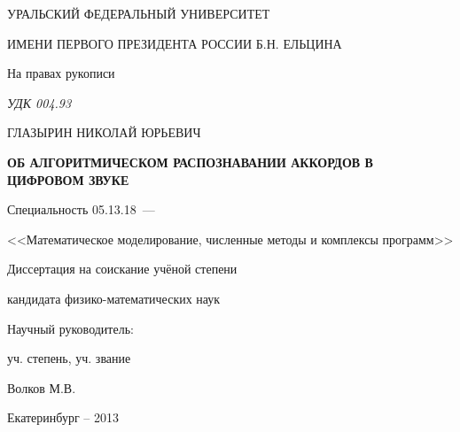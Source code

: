 \thispagestyle{empty}

\begin{center}
УРАЛЬСКИЙ ФЕДЕРАЛЬНЫЙ УНИВЕРСИТЕТ\par
ИМЕНИ ПЕРВОГО ПРЕЗИДЕНТА РОССИИ Б.Н. ЕЛЬЦИНА\par 
\par
\end{center}

\vspace{20mm}
\begin{flushright}
На правах рукописи

{\sl УДК 004.93}
\end{flushright}

\vspace{30mm}
\begin{center}
{\large ГЛАЗЫРИН НИКОЛАЙ ЮРЬЕВИЧ}
\end{center}

\vspace{5mm}
\begin{center}
{\bf \large ОБ АЛГОРИТМИЧЕСКОМ РАСПОЗНАВАНИИ АККОРДОВ В ЦИФРОВОМ ЗВУКЕ
\par}

\vspace{10mm}
{%
Специальность 05.13.18~---

<<Математическое моделирование, численные методы и комплексы программ>>
}

\vspace{10mm}
Диссертация на соискание учёной степени

кандидата физико-математических наук
\end{center}

\vspace{20mm}
\begin{flushright}
Научный руководитель:

уч. степень, уч. звание

Волков М.В.

\end{flushright}

\vspace{20mm}
\begin{center}
{Екатеринбург -- 2013}
\end{center}

\newpage